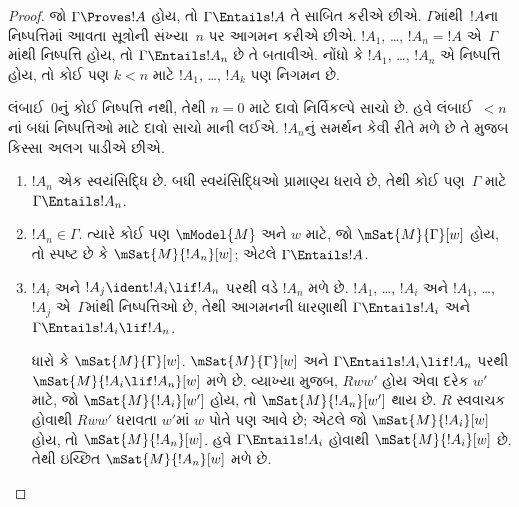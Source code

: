 \begin{proof}
  જો $\Gamma \Proves !A$ હોય, તો $\Gamma \Entails !A$
  તે સાબિત કરીએ છીએ. $\Gamma$માંથી~$!A$ના નિષ્પત્તિમાં
  આવતા સૂત્રોની સંખ્યા~$n$ પર આગમન કરીએ છીએ.
  $!A_1$, \dots, $!A_n = !A$ એ~$\Gamma$માંથી
  નિષ્પત્તિ હોય, તો $\Gamma \Entails !A_n$ છે તે બતાવીએ.
  નોંધો કે $!A_1$, \dots, $!A_n$ એ નિષ્પત્તિ હોય,
  તો કોઈ પણ $k<n$ માટે $!A_1$, \dots, $!A_k$ પણ
  નિગમન છે.

  લંબાઈ~$0$નું કોઈ નિષ્પત્તિ નથી, તેથી $n=0$ માટે
  દાવો નિર્વિકલ્પે સાચો છે. હવે લંબાઈ~$<n$નાં બધાં
  નિષ્પત્તિઓ માટે દાવો સાચો માની લઈએ. $!A_n$નું
  સમર્થન કેવી રીતે મળે છે તે મુજબ કિસ્સા અલગ પાડીએ છીએ.

  \begin{enumerate}
  \item $!A_n$ એક સ્વયંસિદ્ધિ છે. બધી સ્વયંસિદ્ધિઓ
    પ્રામાણ્ય ધરાવે છે, તેથી કોઈ પણ~$\Gamma$ માટે
    $\Gamma \Entails !A_n$.
  \item $!A_n \in \Gamma$. ત્યારે કોઈ પણ $\mModel{M}$
    અને $w$ માટે, જો $\mSat{M}{\Gamma}[w]$ હોય, તો
    સ્પષ્ટ છે કે $\mSat{M}{!A_n}[w]$; એટલે
    $\Gamma \Entails !A$.
  \item $!A_i$ અને $!A_j \ident !A_i \lif !A_n$ પરથી
    \MP{} વડે $!A_n$ મળે છે. $!A_1$, \dots, $!A_i$
    અને $!A_1$, \dots, $!A_j$ એ~$\Gamma$માંથી
    નિષ્પત્તિઓ છે, તેથી આગમનની ધારણાથી
    $\Gamma \Entails !A_i$ અને
    $\Gamma \Entails !A_i \lif !A_n$.

    ધારો કે $\mSat{M}{\Gamma}[w]$. $\mSat{M}{\Gamma}[w]$
    અને
    $\Gamma \Entails !A_i \lif !A_n$ પરથી
    $\mSat{M}{!A_i \lif !A_n}[w]$ મળે છે. વ્યાખ્યા મુજબ,
    $Rww'$ હોય એવા દરેક $w'$ માટે, જો
    $\mSat{M}{!A_i}[w']$ હોય, તો
    $\mSat{M}{!A_n}[w']$ થાય છે. $R$ સ્વવાચક હોવાથી
    $Rww'$ ધરાવતા $w'$માં $w$ પોતે પણ આવે છે;
    એટલે જો $\mSat{M}{!A_i}[w]$ હોય, તો
    $\mSat{M}{!A_n}[w]$. હવે $\Gamma \Entails !A_i$
    હોવાથી $\mSat{M}{!A_i}[w]$ છે. તેથી ઇચ્છિત
    $\mSat{M}{!A_n}[w]$ મળે છે.
  \end{enumerate}
\end{proof}
\endgroup

\begingroup
\makeatletter{}\makeatother


\label{guunit:OLP-0505}


